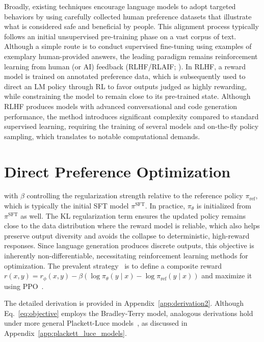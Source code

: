 Broadly, existing techniques encourage language models to adopt targeted behaviors by using carefully collected human preference datasets that illustrate what is considered safe and beneficial by people. This alignment process typically follows an initial unsupervised pre-training phase on a vast corpus of text. Although a simple route is to conduct supervised fine-tuning using examples of exemplary human-provided answers, the leading paradigm remains reinforcement learning from human (or AI) feedback (RLHF/RLAIF; \citep{christiano2017deep,bai2022constitutional}). In RLHF, a reward model is trained on annotated preference data, which is subsequently used to direct an LM policy through RL to favor outputs judged as highly rewarding, while constraining the model to remain close to its pre-trained state. Although RLHF produces models with advanced conversational and code generation performance, the method introduces significant complexity compared to standard supervised learning, requiring the training of several models and on-the-fly policy sampling, which translates to notable computational demands.

\section{Direct Preference Optimization}\label{sec:DPO}

with $\beta$ controlling the regularization strength relative to the reference policy $\pi_\text{ref}$, which is typically the initial SFT model $\pi^\text{SFT}$. In practice, $\pi_\theta$ is initialized from $\pi^\text{SFT}$ as well. The KL regularization term ensures the updated policy remains close to the data distribution where the reward model is reliable, which also helps preserve output diversity and avoids the collapse to deterministic, high-reward responses. Since language generation produces discrete outputs, this objective is inherently non-differentiable, necessitating reinforcement learning methods for optimization. The prevalent strategy~\citep{ziegler2020finetuning, stiennon2022learning, bai2022training, ouyang2022training} is to define a composite reward $r(x, y) = r_{\phi}(x, y) -\beta (\log \pi_{\theta}(y\mid x) - \log \pi_\text{ref}(y\mid x))$ and maximize it using PPO~\cite{schulman2017proximal}. 

The detailed derivation is provided in Appendix~\ref{app:derivation2}. Although Eq.~\ref{eq:objective} employs the Bradley-Terry model, analogous derivations hold under more general Plackett-Luce models~\citep{plackett1975analysis, luce2012individual}, as discussed in Appendix~\ref{app:plackett_luce_models}.

